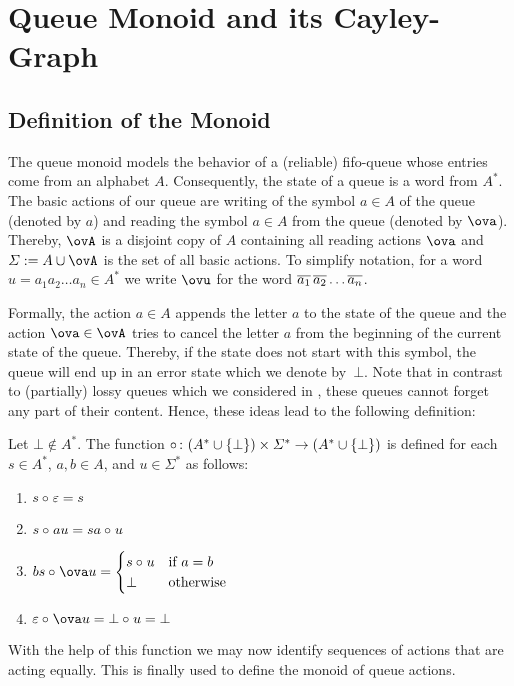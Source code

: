 \section{Queue Monoid and its Cayley-Graph}
\subsection{Definition of the Monoid}
The queue monoid models the behavior of a (reliable) fifo-queue whose entries come from an alphabet $A$. Consequently, the state of a queue is a word from $A^*$. The basic actions of our queue are writing of the symbol $a\in A$ of the queue (denoted by $a$) and reading the symbol $a\in A$ from the queue (denoted by $\ova$). Thereby, $\ovA$ is a disjoint copy of $A$ containing all reading actions $\ova$ and $\varSigma:=A\cup\ovA$ is the set of all basic actions. To simplify notation, for a word $u=a_1a_2\dots a_n\in A^*$ we write $\ovu$ for the word $\overline{a_1}\,\overline{a_2}\dots \overline{a_n}$.

Formally, the action $a\in A$ appends the letter $a$ to the state of the queue and the action $\ova\in\ovA$ tries to cancel the letter $a$ from the beginning of the current state of the queue. Thereby, if the state does not start with this symbol, the queue will end up in an error state which we denote by~$\bot$. Note that in contrast to (partially) lossy queues which we considered in \cite{KKP18,Koe18}, these queues cannot forget any part of their content. Hence, these ideas lead to the following definition:

\begin{definition}
	Let $\bot\notin A^*$. The function $\circ_{}\colon(A^*\cup\{\bot\})\times\varSigma^*\to(A^*\cup\{\bot\})$ is defined for each $s\in A^*$, $a,b\in A$, and $u\in\varSigma^*$ as follows:
	\begin{enumerate}[(1)]
		\item $s\circ_{} \varepsilon=s$
		\item $s\circ_{} au=sa\circ_{} u$
		\item $bs\opx \ova u=\begin{cases}
		s\opx u & \text{if }a=b\\
		\bot & \text{otherwise}
		\end{cases}$
		\item $\varepsilon\opx \ova u=\bot\opx u=\bot$
	\end{enumerate}
\end{definition}

With the help of this function we may now identify sequences of actions that are acting equally. This is finally used to define the monoid of queue actions.

